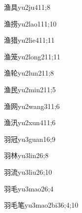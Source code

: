 \begin{verbete}{渔具}{yu2ju4}{11;8}
\end{verbete}

\begin{verbete}{渔捞}{yu2lao1}{11;10}
\end{verbete}

\begin{verbete}{渔猎}{yu2lie4}{11;11}
\end{verbete}

\begin{verbete}{渔笼}{yu2long2}{11;11}
\end{verbete}

\begin{verbete}{渔轮}{yu2lun2}{11;8}
\end{verbete}

\begin{verbete}{渔民}{yu2min2}{11;5}
\end{verbete}

\begin{verbete}{渔网}{yu2wang3}{11;6}
\end{verbete}

\begin{verbete}{渔汛}{yu2xun4}{11;6}
\end{verbete}

\begin{verbete}{羽冠}{yu3guan1}{6;9}
\end{verbete}

\begin{verbete}{羽林}{yu3lin2}{6;8}
\end{verbete}

\begin{verbete}{羽流}{yu3liu2}{6;10}
\end{verbete}

\begin{verbete}{羽毛}{yu3mao2}{6;4}
\end{verbete}

\begin{verbete}{羽毛笔}{yu3mao2bi3}{6;4;10}
\end{verbete}


